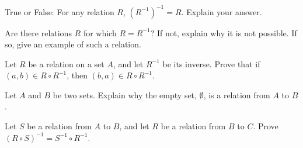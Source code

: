 \begin{prob}
True or False: For any relation $R$, $(R^{-1})^{-1} = R$. Explain your answer.
\end{prob}

\begin{prob}
Are there relations $R$ for which $R=R^{-1}$? If not, explain why it is not possible. If so, give an example
of such a relation.
\end{prob}

\begin{prob}
Let $R$ be a relation on a set $A$, and let $R^{-1}$ be its inverse. Prove that if $(a,b)\in R\circ R^{-1}$,
then $(b,a)\in R\circ R^{-1}$.
\end{prob}

\begin{prob}
Let $A$ and $B$ be two sets. Explain why the empty set, $\emptyset$, is a relation from $A$ to $B$.
\end{prob}

\begin{prob}
Let $S$ be a relation from $A$ to $B$, and let $R$ be a relation from $B$ to $C$. Prove
$(R\circ S)^{-1} = S^{-1}\circ R^{-1}$.
\end{prob}